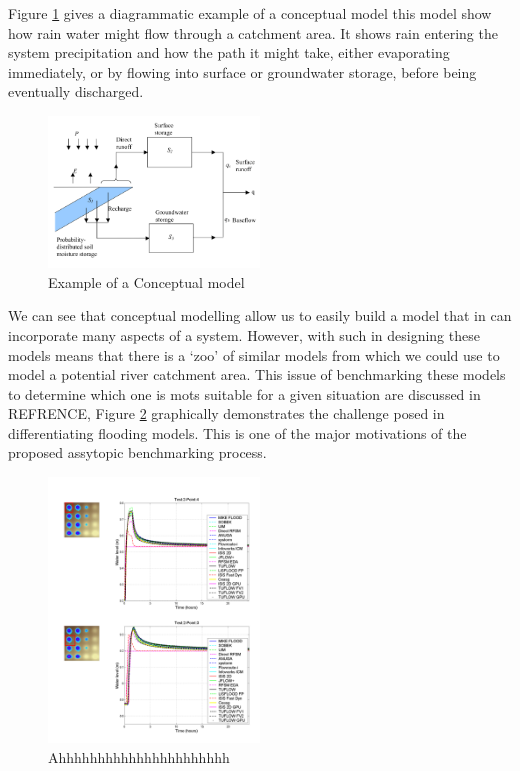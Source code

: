 \documentclass[11pt]{article}
\begin{document}
Figure \ref{fig:conceptual} gives a diagrammatic example of a conceptual model this model show how rain water might flow through a catchment area. It shows rain entering the system precipitation and how the path it might take, either evaporating immediately, or by flowing into surface or groundwater storage, before being eventually discharged.
\begin{figure}[H]
    \centering
    \includegraphics[width=0.5\textwidth]{Figs/Concept.png}
    \caption{Example of a Conceptual model}
    \label{fig:conceptual}
\end{figure}
    
We can see that conceptual modelling allow us to easily build a model that in can incorporate many aspects of a system. However, with such in designing these models means that there is a `zoo' of similar models from which we could use to model a potential river catchment area. This issue of benchmarking these models to determine which one is mots suitable for a given situation are discussed in REFRENCE, Figure \ref{fig:eaBench} graphically demonstrates the challenge posed in differentiating flooding models. This is one of the major motivations of the proposed assytopic benchmarking process.

\begin{figure}[H]
    \centering
    \includegraphics[width=0.5\textwidth]{Figs/EA_bench.png}
    \caption{Ahhhhhhhhhhhhhhhhhhhhhh}
    \label{fig:eaBench}
\end{figure}
\end{document}
